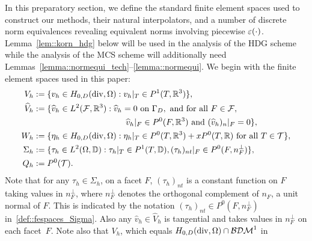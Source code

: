 In this preparatory section, we define the standard finite
  element spaces used to construct our methods, their natural
  interpolators, and a number of discrete norm equivalences revealing
  equivalent norms involving piecewise
  ${\varepsilon}(\cdot)$. Lemma~\ref{lem::korn_hdg} below will be used in the
  analysis of the HDG scheme while the analysis of the MCS scheme will additionally need 
  Lemmas~\ref{lemma::normequi_tech}--\ref{lemma::normequi}.
  We begin with the finite element spaces used in this paper:
\begin{subequations} \label{def::fespaces}
  \begin{align}
    V_h &:= \{v_h \in H_{0,D}(\div,\Omega): v_h|_T \in P^1(T,\rr^3)\}, \label{def::fespaces_V} \\\
    \hat V_h &:= \{ \hat v_h \in L^2(\facets, \rr^3):
               \hat v_h = 0 \textrm{ on } \Gamma_D, \text{ and for all }
               F \in \facets,
    \nonumber \\
    & \hspace{3.85cm} \hat v_h|_F \in P^0(F,\rr^3) \text{ and }  (\hat v_h)_n|_F = 0  \}, \label{def::fespaces_Vhat}\\
    W_h &:= \{ \eta_h \in H_{0,D}(\div, \Omega): \eta_h|_T \in P^0(T, \rr^3) + x  P^0(T,\rr)\Forall T \in \mesh \},\label{def::fespaces_W}\\
    \Sigma_h &:= \{ \tau_h \in L^2(\Omega, \dd): \tau_h|_T \in P^1(T, \dd), (\tau_h)_{nt}|_F \in P^0(F, n_F^\perp) \}, \label{def::fespaces_Sigma}\\
    Q_h &:= P^0(\mesh).\label{def::fespaces_Q}
  \end{align}
\end{subequations}
Note that for any $\tau_h \in \Sigma_h$, on a facet $F$, 
  $(\tau_h)_{nt}$ is a constant
  function on $F$ taking values in $n_F^\perp$, where $n_F^\perp$ denotes the
  orthogonal complement of $n_F$, a unit normal of $F$. This is indicated by the
  notation  $(\tau_h)_{nt} \in P^0(F,n_F^\perp)$  in~\eqref{def::fespaces_Sigma}.
Also any $\hat v_h \in \hat V_h$ is tangential and 
takes values in $n_F^\perp$
on each facet~$F$.
Note also that $V_h$, which equals $H_{0,D}(\operatorname{div},\Omega) \cap \mathcal{BDM}^1$ in
